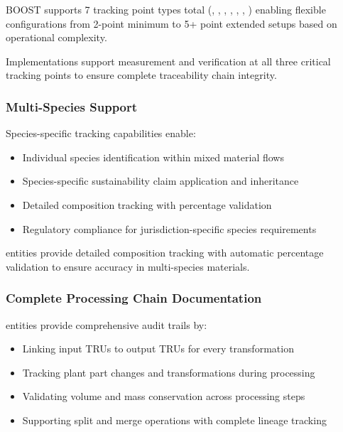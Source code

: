 BOOST supports 7 tracking point types total (, , , , , , ) enabling flexible configurations from 2-point minimum to 5+ point extended setups based on operational complexity.

\begin{normative}[title=Critical Tracking Point Requirements]
Implementations \MUST{} support measurement and verification at all three critical tracking points to ensure complete traceability chain integrity.
\end{normative}

\subsubsection{Multi-Species Support}
\label{sec:multi-species-support}

Species-specific tracking capabilities enable:

\begin{itemize}
    \item Individual species identification within mixed material flows
    \item Species-specific sustainability claim application and inheritance
    \item Detailed composition tracking with percentage validation
    \item Regulatory compliance for jurisdiction-specific species requirements
\end{itemize}

\begin{informative}[title=Species Composition Validation]
 entities provide detailed composition tracking with automatic percentage validation to ensure accuracy in multi-species materials.
\end{informative}

\subsubsection{Complete Processing Chain Documentation}
\label{sec:processing-chain-documentation}

 entities provide comprehensive audit trails by:

\begin{itemize}
    \item Linking input TRUs to output TRUs for every transformation
    \item Tracking plant part changes and transformations during processing
    \item Validating volume and mass conservation across processing steps
    \item Supporting split and merge operations with complete lineage tracking
\end{itemize}

